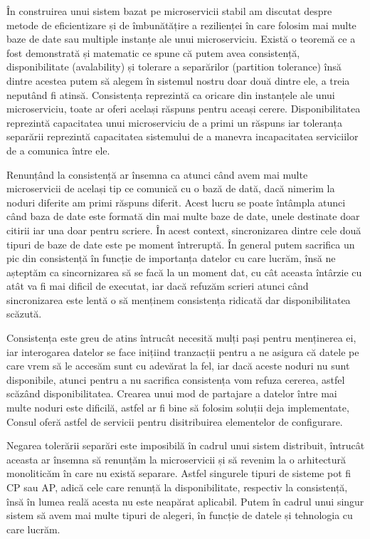 În construirea unui sistem bazat pe microservicii stabil am discutat despre metode de
eficientizare și de îmbunătățire a rezilienței în care folosim mai multe baze de date sau
multiple instanțe ale unui microserviciu. Există o teoremă ce a fost demonstrată și matematic ce
spune că putem avea consistență, disponibilitate (avalability) și tolerare a separărilor
(partition tolerance) însă dintre acestea putem să alegem în sistemul nostru doar două dintre ele,
a treia neputând fi atinsă. Consistența reprezintă ca oricare din instanțele ale unui microserviciu,
toate ar oferi același răspuns pentru aceași cerere. Disponibilitatea reprezintă capacitatea
unui microserviciu de a primi un răspuns iar toleranța separării reprezintă capacitatea
sistemului de a manevra incapacitatea serviciilor de a comunica între ele.

Renunțând la consistență ar însemna ca atunci când avem mai multe microservicii de același tip ce comunică
cu o bază de dată, dacă nimerim la noduri diferite am primi răspuns diferit. Acest lucru se
poate întâmpla atunci când baza de date este formată din mai multe baze de date, unele
destinate doar citirii iar una doar pentru scriere. În acest context, sincronizarea
dintre cele două tipuri de baze de date este pe moment întreruptă. În general putem
sacrifica un pic din consistență în funcție de importanța datelor cu care lucrăm, însă
ne așteptăm ca sincornizarea să se facă la un moment dat, cu cât aceasta întârzie cu atât
va fi mai dificil de executat, iar dacă refuzăm scrieri atunci când sincronizarea
este lentă o să menținem consistența ridicată dar disponibilitatea scăzută.

Consistența este greu de atins întrucât necesită mulți pași pentru menținerea ei, iar interogarea
datelor se face inițiind tranzacții pentru a ne asigura că datele pe care vrem să
le accesăm sunt cu adevărat la fel, iar dacă aceste noduri nu sunt disponibile, atunci pentru a
nu sacrifica consistența vom refuza cererea, astfel scăzând disponibilitatea. Crearea unui mod
de partajare a datelor între mai multe noduri este dificilă, astfel ar fi bine să folosim
soluții deja implementate, Consul oferă astfel de servicii pentru disitribuirea elementelor
de configurare.

Negarea tolerării separări este imposibilă în cadrul unui sistem distribuit, întrucât aceasta
ar însemna să renunțăm la microservicii și să revenim la o arhitectură monoliticăm în care
nu există separare. Astfel singurele tipuri de sisteme pot fi CP sau AP, adică cele care
renunță la disponibilitate, respectiv la consistență, însă în lumea reală acesta nu
este neapărat aplicabil. Putem în cadrul unui singur sistem să avem mai multe tipuri de alegeri,
în funcție de datele și tehnologia cu care lucrăm.

